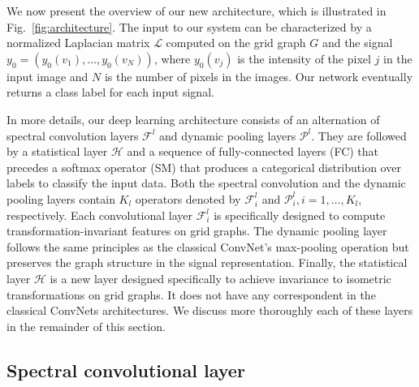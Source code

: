 \documentclass[10pt,journal,compsoc]{IEEEtran}
\begin{document}
	We now present the overview of our new architecture, which is illustrated in Fig.~\ref{fig:architecture}. The input to our system can be characterized by a normalized Laplacian matrix $\mathcal{L}$ computed on the grid graph $G$ and the signal $y_0 = (y_0(v_1), \dots, y_0(v_N))$, where $y_0(v_j)$ is the intensity of the pixel $j$ in the input image and $N$ is the number of pixels in the images. Our network eventually returns a class label for each input signal.

	In more details, our deep learning architecture consists of an alternation of spectral convolution layers $\mathcal{F}^{l}$ and dynamic pooling layers $\mathcal{P}^{l}$. They are followed by a statistical layer $\mathcal{H}$ and a sequence of fully-connected layers (FC) that precedes a softmax operator (SM) that produces a categorical distribution over labels to classify the input data. Both the spectral convolution and the dynamic pooling layers contain $K_l$ operators denoted by $\mathcal{F}_i^{l}$ and $\mathcal{P}_i^{l}, i=1,\dots,K_l$, respectively.  Each convolutional layer $\mathcal{F}_i^{l}$ is specifically designed to compute transformation-invariant features on grid graphs. The dynamic pooling layer follows the same principles as the classical ConvNet's max-pooling operation but preserves the graph structure in the signal representation. Finally, the statistical layer $\mathcal{H}$ is a new layer designed specifically to achieve invariance to isometric transformations on grid graphs. It does not have any correspondent in the classical ConvNets architectures. We discuss more thoroughly each of these layers in the remainder of this section.

	\subsection{Spectral convolutional layer}
	\label{s:conv}
\end{document}
